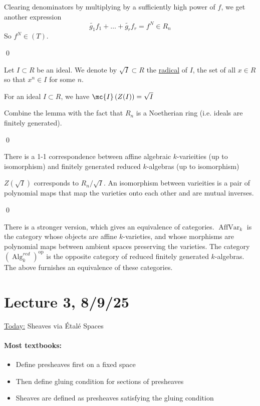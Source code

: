 \documentclass[x11names,reqno,14pt]{extarticle}
\begin{document}
Clearing denominators by multiplying by a sufficiently high power of $f$, we get another expression
\[
\tilde{g_1}f_1 + \dots + \tilde{g_r}f_r = f^N \in R_n
\]
So $f^N \in (T)$. 

\qed


Let $I \subset R$ be an ideal. We denote by $\sqrt{I} \subset R$ the \underline{radical} of $I$, the set of all $x \in R$ so that $x^n \in I$ for some $n$. 

\thm[Nullstellensatz]

For an ideal $I \subset R$, we have $\mc{I}\left(Z(I)\right) = \sqrt{I}$

\proof

Combine the lemma with the fact that $R_n$ is a Noetherian ring (i.e. ideals are finitely generated). 

\qed

\cor

There is a 1-1 correspondence between affine algebraic $k$-varieities (up to isomorphism) and finitely generated reduced $k$-algebras (up to isomorphism)

\proof

$Z(\sqrt{I})$ corresponds to $R_n / \sqrt{I}$. An isomorphism between varieities is a pair of polynomial maps that map the varieties onto each other and are mutual inverses. 

\qed

There is a stronger version, which gives an equivalence of categories. $\operatorname{AffVar}_k$ is the category whose objects are affine $k$-varieties, and whose morphisms are polynomial maps between ambient spaces preserving the varieties. The category $(\operatorname{Alg}^{red}_k)^\text{op}$ is the opposite category of reduced finitely generated $k$-algebras. The above furnishes an equivalence of these categories. 


\section*{Lecture 3, 8/9/25}

\underline{Today:} Sheaves via \'Etal\'e Spaces

\paragraph{Most textbooks:} 
\begin{itemize}

\item Define presheaves first on a fixed space

\item Then define gluing condition for sections of presheaves

\item Sheaves are defined as presheaves satisfying the gluing condition

\end{itemize}
\end{document}
